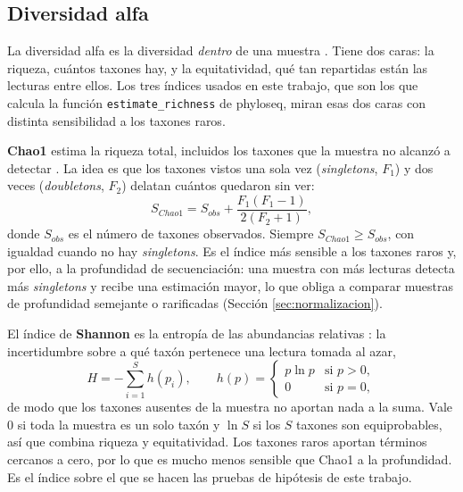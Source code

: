 \subsection{Diversidad alfa}
\label{sec:diversidad_alfa}

La diversidad alfa es la diversidad \emph{dentro} de una muestra \citep{whittaker1960vegetation,
whittaker1972evolution}. Tiene dos caras: la riqueza, cuántos taxones hay, y la equitatividad, qué tan
repartidas están las lecturas entre ellos. Los tres índices usados en este trabajo, que son los que
calcula la función \texttt{estimate\_richness} de phyloseq, miran esas dos caras con distinta
sensibilidad a los taxones raros.

\textbf{Chao1} estima la riqueza total, incluidos los taxones que la muestra no alcanzó a detectar
\citep{chao1984nonparametric, chao1987estimating}. La idea es que los taxones vistos una sola vez
(\emph{singletons}, $F_1$) y dos veces (\emph{doubletons}, $F_2$) delatan cuántos quedaron sin ver:
\begin{equation}
S_{Chao1} = S_{obs} + \frac{F_1(F_1-1)}{2(F_2+1)},
\label{eq:chao1}
\end{equation}
donde $S_{obs}$ es el número de taxones observados. Siempre $S_{Chao1} \geq S_{obs}$, con igualdad
cuando no hay \emph{singletons}. Es el índice más sensible a los taxones raros y, por ello, a la
profundidad de secuenciación: una muestra con más lecturas detecta más \emph{singletons} y recibe una
estimación mayor, lo que obliga a comparar muestras de profundidad semejante o rarificadas
(Sección \ref{sec:normalizacion}).

El índice de \textbf{Shannon} es la entropía de las abundancias relativas
\citep{shannon1948mathematical}: la incertidumbre sobre a qué taxón pertenece una lectura tomada al
azar,
\begin{equation}
H = -\sum_{i=1}^{S} h(p_i), \qquad
h(p) =
\begin{cases}
p \ln p & \text{si } p > 0, \\
0 & \text{si } p = 0,
\end{cases}
\label{eq:shannon}
\end{equation}
de modo que los taxones ausentes de la muestra no aportan nada a la suma. Vale $0$ si toda la muestra es un solo taxón y $\ln S$ si los $S$
taxones son equiprobables, así que combina riqueza y equitatividad. Los taxones raros aportan términos
cercanos a cero, por lo que es mucho menos sensible que Chao1 a la profundidad. Es el índice sobre el
que se hacen las pruebas de hipótesis de este trabajo.


